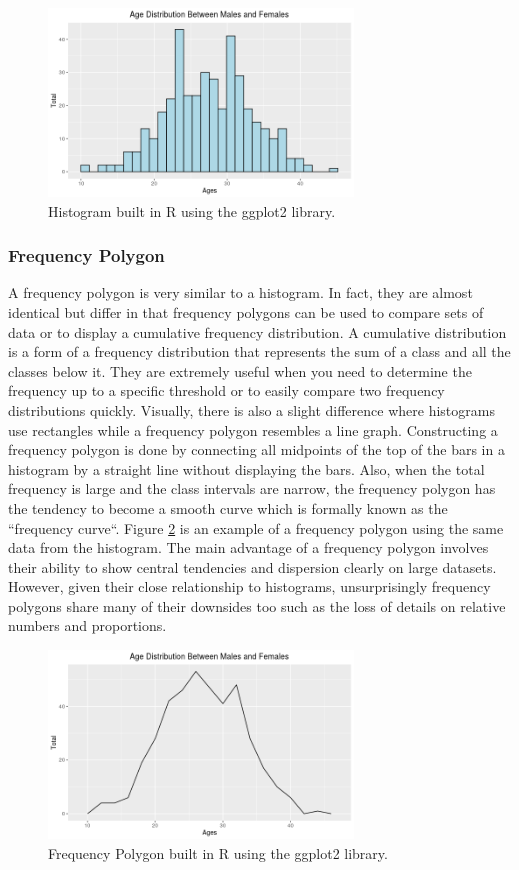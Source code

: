 \begin{figure}[H]
    \centering
        \includegraphics[height=5cm]{figures/histogram.png}
    \caption{Histogram built in R using the ggplot2 library.}
    \label{figure:histogram}
\end{figure} 

\subsubsection{Frequency Polygon}
A frequency polygon is very similar to a histogram. In fact, they are almost 
identical but differ in that frequency polygons can be used to compare sets of data or 
to display a cumulative frequency distribution. A cumulative distribution is a 
form of a frequency distribution that represents the sum of a class and all the
classes below it. They are extremely useful when you need to determine the frequency 
up to a specific threshold or to easily compare two frequency distributions quickly.
Visually, there is also a slight difference where histograms use rectangles 
while a frequency polygon resembles a line graph. Constructing a frequency polygon 
is done by connecting all midpoints of the top of the bars in a histogram by a 
straight line without displaying the bars. Also, when the total frequency is large 
and the class intervals are narrow, the frequency polygon has the tendency to become 
a smooth curve which is formally known as the ``frequency curve``. Figure \ref{figure:freq_polygon}
is an example of a frequency polygon using the same data from the histogram. The 
main advantage of a frequency polygon involves their ability to show central 
tendencies and dispersion clearly on large datasets. However, given their close 
relationship to histograms, unsurprisingly frequency polygons share many of their 
downsides too such as the loss of details on relative numbers and proportions. 

\begin{figure}[H]
    \centering
        \includegraphics[height=5cm]{figures/freq_polygon.png}
    \caption{Frequency Polygon built in R using the ggplot2 library.}
    \label{figure:freq_polygon}
\end{figure}  

